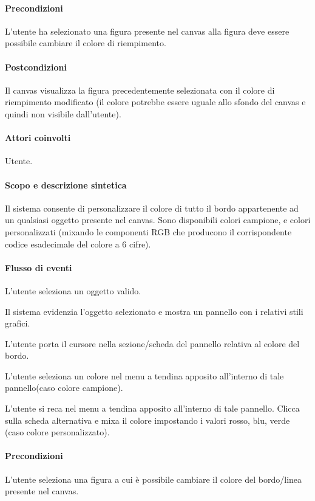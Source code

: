 \paragraph{Precondizioni} L'utente ha selezionato una figura presente nel canvas alla figura deve essere possibile cambiare il colore di riempimento.
\paragraph{Postcondizioni} Il canvas visualizza la figura precedentemente selezionata con il colore di riempimento modificato (il colore potrebbe essere uguale allo sfondo del canvas e quindi non visibile dall'utente).


\paragraph{Attori coinvolti} Utente.
\paragraph{Scopo e descrizione sintetica} Il sistema consente di personalizzare il colore di tutto il bordo appartenente ad un qualsiasi oggetto presente nel canvas. Sono disponibili colori campione, e colori personalizzati (mixando le componenti RGB che producono il corrispondente codice esadecimale del colore a 6 cifre).
\paragraph{Flusso di eventi}
\begin{elenconumerato}[\textbf{}]{\subsubsecindent}
\item L'utente seleziona un oggetto valido.
\item Il sistema evidenzia l'oggetto selezionato e mostra un pannello con i relativi stili grafici.
\item L'utente  porta  il cursore nella sezione/scheda del pannello relativa al colore del bordo.
\item L'utente seleziona un colore  nel menu a tendina apposito all'interno di tale pannello(caso colore campione).
\item L'utente si reca nel menu a tendina apposito all'interno di tale pannello. Clicca sulla scheda alternativa e mixa il colore impostando i valori rosso, blu, verde (caso colore personalizzato).
\end{elenconumerato}
\paragraph{Precondizioni} L'utente seleziona una figura a cui \`e possibile cambiare il colore del bordo/linea presente nel canvas.
